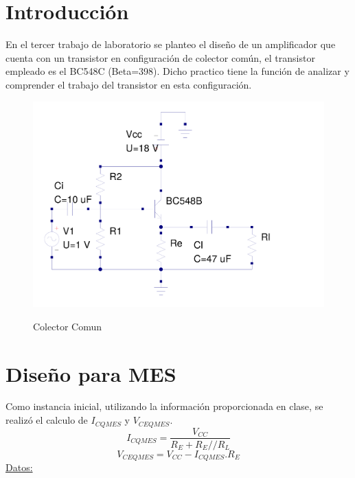 \documentclass[12pt]{article}
\begin{document}

\tableofcontents
\pagebreak


\section{Introducción}
En el tercer trabajo de laboratorio se planteo el diseño de un amplificador que cuenta con un transistor en configuración de colector común, el transistor empleado es el BC548C (Beta=398). Dicho practico tiene la función de analizar y comprender el trabajo del transistor en esta configuración.
\begin{figure}[ht]
\centering 
\includegraphics[scale = 0.5]{cc.pdf}\\[0.25 cm]	%
\caption{Colector Comun}
\label{Figura 1}
\end{figure}

\newpage
\section{Diseño para MES}
Como instancia inicial, utilizando la información proporcionada en clase, se realizó el calculo de $I_{CQMES}$ y $V_{CEQMES}$. 
\begin{equation}
\label{ICQMES}
I_{CQMES}=\dfrac{V_{CC}}{R_E+R_E//R_L}
\end{equation}
\begin{equation}
\label{VCEQMES}
V_{CEQMES}=V_{CC}-I_{CQMES}.R_E
\end{equation}
\underline{Datos:}
\end{document}
